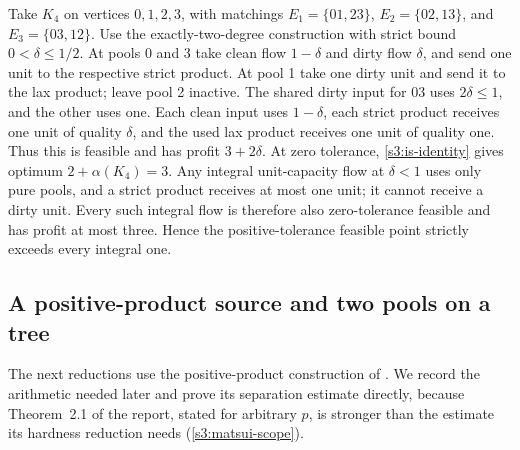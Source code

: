 \begin{example}\label{s3:tolerance-example}
Take $K_4$ on vertices $0,1,2,3$, with matchings
$E_1=\{01,23\}$, $E_2=\{02,13\}$, and $E_3=\{03,12\}$.
Use the exactly-two-degree construction with strict bound
$0<\delta\le1/2$. At pools 0 and 3 take clean flow $1-\delta$ and
dirty flow $\delta$, and send one unit to the respective strict product.
At pool 1 take one dirty unit and send it to the lax product; leave pool
2 inactive. The shared dirty input for $03$ uses $2\delta\le1$, and
the other uses one. Each clean input uses $1-\delta$, each strict product
receives one unit of quality $\delta$, and the used lax product receives
one unit of quality one. Thus this is feasible and has profit
$3+2\delta$. At zero tolerance, \eqref{s3:is-identity} gives optimum
$2+\alpha(K_4)=3$. Any integral unit-capacity flow at $\delta<1$
uses only pure pools, and a strict product receives at most one unit;
it cannot receive a dirty unit. Every such integral flow is therefore
also zero-tolerance feasible and has profit at most three. Hence the
positive-tolerance feasible point strictly exceeds every integral one.
\end{example}

\subsection{A positive-product source and two pools on a tree}\label{s3:positive-product}

The next reductions use the positive-product construction of
\citet[METR95-13, Sections~2--3, pp.~2--7]{s3:matsui1996}. We record the
arithmetic needed later and prove its separation estimate directly,
because Theorem~2.1 of the report, stated for arbitrary $p$, is stronger
than the estimate its hardness reduction needs
(\cref{s3:matsui-scope}).

